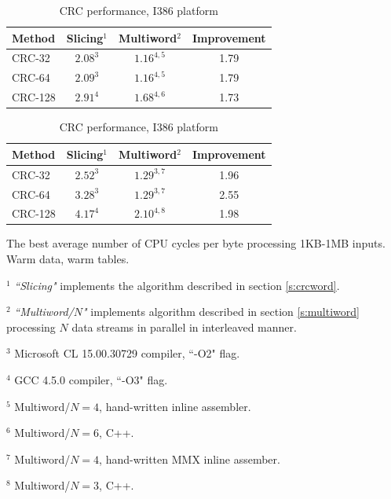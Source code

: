 \documentclass{article}
\begin{document}
\begin{table}
\begin{center}

\caption{CRC performance, AMD64 platform} \label{t:AveragePerformance64}
\begin{tabular}{| l | c | c | c |}
  \hline
Method               & Slicing$^1$ & Multiword$^2$ & Improvement \\
  \hline
              CRC-32 &  $2.08^3$   &  $1.16^{4,5}$ & 1.79    \\
              CRC-64 &  $2.09^3$   &  $1.16^{4,5}$ & 1.79    \\
             CRC-128 &  $2.91^4$   &  $1.68^{4,6}$ & 1.73    \\
  \hline
\end{tabular}
{}

\caption{CRC performance, I386 platform} \label{t:AveragePerformance32}
\begin{tabular}{| l | c | c | c |}
  \hline
Method               & Slicing$^1$ & Multiword$^2$ & Improvement \\
  \hline
              CRC-32 &  $2.52^3$   &  $1.29^{3,7}$ & 1.96   \\
              CRC-64 &  $3.28^3$   &  $1.29^{3,7}$ & 2.55   \\
             CRC-128 &  $4.17^4$   &  $2.10^{4,8}$ & 1.98   \\
  \hline
\end{tabular}
{}
\end{center}



The best average number of CPU cycles per byte processing 1KB-1MB inputs.
Warm data, warm tables.

$^1$ {\it``Slicing"} implements the algorithm described in section
\ref{s:crcword}.

$^2$ {\it``Multiword/$N$"} implements algorithm described in section
\ref{s:multiword} processing $N$ data streams in parallel in interleaved
manner.

$^3$ Microsoft CL 15.00.30729 compiler, ``-O2" flag.

$^4$ GCC 4.5.0 compiler, ``-O3" flag.

$^5$ Multiword/$N=4$, hand-written inline assembler.

$^6$ Multiword/$N=6$, C++.

$^7$ Multiword/$N=4$, hand-written MMX inline assember.

$^8$ Multiword/$N=3$, C++.

\end{table}
\end{document}
